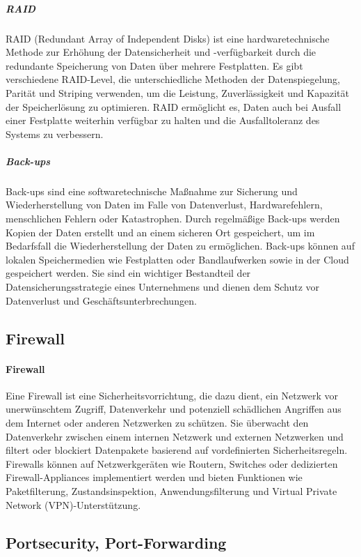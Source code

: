 \subparagraph{RAID}

RAID (Redundant Array of Independent Disks) ist eine hardwaretechnische Methode zur Erhöhung der Datensicherheit und -verfügbarkeit durch die redundante Speicherung von Daten über mehrere Festplatten. Es gibt verschiedene RAID-Level, die unterschiedliche Methoden der Datenspiegelung, Parität und Striping verwenden, um die Leistung, Zuverlässigkeit und Kapazität der Speicherlösung zu optimieren. RAID ermöglicht es, Daten auch bei Ausfall einer Festplatte weiterhin verfügbar zu halten und die Ausfalltoleranz des Systems zu verbessern.

\subparagraph{Back-ups}

Back-ups sind eine softwaretechnische Maßnahme zur Sicherung und Wiederherstellung von Daten im Falle von Datenverlust, Hardwarefehlern, menschlichen Fehlern oder Katastrophen. Durch regelmäßige Back-ups werden Kopien der Daten erstellt und an einem sicheren Ort gespeichert, um im Bedarfsfall die Wiederherstellung der Daten zu ermöglichen. Back-ups können auf lokalen Speichermedien wie Festplatten oder Bandlaufwerken sowie in der Cloud gespeichert werden. Sie sind ein wichtiger Bestandteil der Datensicherungsstrategie eines Unternehmens und dienen dem Schutz vor Datenverlust und Geschäftsunterbrechungen.

\subsection{Firewall}

\paragraph{Firewall}

Eine Firewall ist eine Sicherheitsvorrichtung, die dazu dient, ein Netzwerk vor unerwünschtem Zugriff, Datenverkehr und potenziell schädlichen Angriffen aus dem Internet oder anderen Netzwerken zu schützen. Sie überwacht den Datenverkehr zwischen einem internen Netzwerk und externen Netzwerken und filtert oder blockiert Datenpakete basierend auf vordefinierten Sicherheitsregeln. Firewalls können auf Netzwerkgeräten wie Routern, Switches oder dedizierten Firewall-Appliances implementiert werden und bieten Funktionen wie Paketfilterung, Zustandsinspektion, Anwendungsfilterung und Virtual Private Network (VPN)-Unterstützung.

\subsection{Portsecurity, Port-Forwarding}

